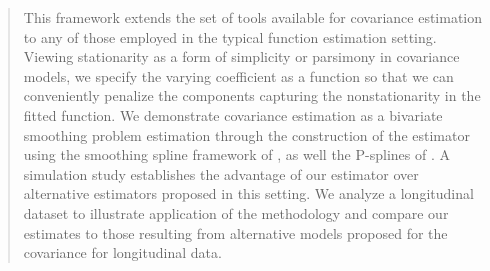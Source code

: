\begin{quote}
This framework extends the set of tools available for covariance estimation to any of those employed in the typical function estimation setting. Viewing stationarity as a form of simplicity or parsimony in covariance models, we specify the varying coefficient as a function so that we can conveniently penalize the components capturing the nonstationarity in the fitted function. We demonstrate covariance estimation as a bivariate smoothing problem estimation through the construction of the estimator using the smoothing spline framework of \cite{kimeldorf1971some}, as well the P-splines of \cite{eilers1996flexible} . A simulation study establishes the advantage of our estimator over alternative estimators proposed in this setting. We analyze a longitudinal dataset to illustrate application of the methodology and compare our estimates to those resulting from alternative models proposed for the covariance for longitudinal data. 

\end{quote}


